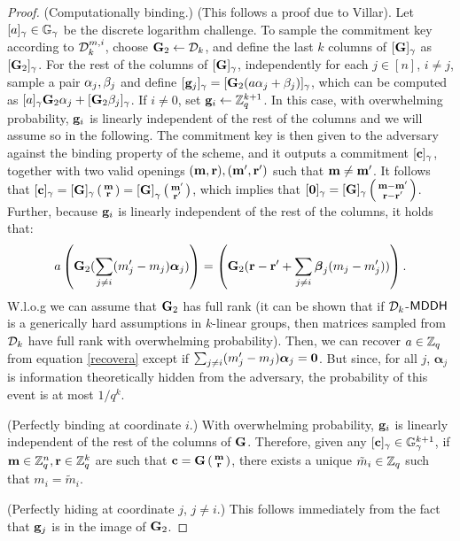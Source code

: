 \begin{proof}
(Computationally binding.) (This follows a proof due to Villar). Let $[a]_\gamma\in\mathbb{G}_{\gamma}$ be the discrete logarithm challenge. To sample the commitment key according to $\mathcal{D}_k^{m,i}$, choose $\mathbf{{G}}_{2} \gets \mathcal{D}_k$, and define the last $k$ columns of $[\mathbf{{G}}]_\gamma$ as $[\mathbf{{G}}_{2}]_{\gamma}$. For the rest of the columns of $[\mathbf{{G}}]_\gamma$, independently  for each $j \in [n]$, $i \neq j$, sample a pair $\mathbf{\alpha}_j,\mathbf{\beta}_j$ and define $[\mathbf{g}_{j}]_{\gamma}=[\mathbf{{G}}_{2} (a \mathbf{\alpha}_j+\beta_j)]_\gamma$,
which can be computed as $[a]_\gamma \mathbf{{G}}_{2}\mathbf{\alpha}_j+[ \mathbf{{G}}_{2} \beta_j]_\gamma$. If $i \neq 0$, set $\mathbf{g}_{i} \gets \mathbb{Z}_q^{k+1}$. In this case, with overwhelming probability,  $\mathbf{g}_{i}$ is linearly independent of the rest of the columns and we will assume so in the following. 
The commitment key is then given to the adversary against the binding property of the scheme, and it outputs a commitment $[\mathbf{c}]_{\gamma}$, together with two valid openings 
$(\mathbf{m},\mathbf{r}), (\mathbf{m}',\mathbf{r}')$ such that $\mathbf{m}\neq \mathbf{m}'$. It follows that $[\mathbf{c}]_{\gamma}=[\mathbf{{G}}]_{\gamma} \left(\begin{smallmatrix}\mathbf{m} \\ \mathbf{r}\end{smallmatrix}\right) = \left[\mathbf{{G}}\right]_{\gamma}\left(\begin{smallmatrix}\mathbf{m}' \\ \mathbf{r}'\end{smallmatrix}\right)$, which implies that $[\mathbf{0}]_{\gamma}=[\mathbf{{G}}]_{\gamma} \left(\begin{smallmatrix}\mathbf{m}-\mathbf{m}' \\ \mathbf{r}-\mathbf{r}'\end{smallmatrix}\right)$. Further, because $\mathbf{g}_i$ is linearly independent of the rest of the columns, it holds that:
\begin{equation}\label{recovera}
a \left(\mathbf{{G}}_{2} (\sum_{j \neq i} (m'_j-m_j)  \boldsymbol{\alpha}_j) \right) = \left(  \mathbf{{G}}_{2}  (\mathbf{r}-\mathbf{r}' + \sum_{j \neq i} \boldsymbol{\beta}_j  (m_j-m_j'))\right).
\end{equation}
W.l.o.g we can assume that $\mathbf{{G}}_{2}$ has full rank (it can be shown that if $\mathcal{D}_k$-$\mathsf{MDDH}$ is a generically hard assumptions in $k$-linear groups, then matrices sampled from $\mathcal{D}_k$ have full rank with overwhelming probability).  Then, we can recover $a \in \mathbb{Z}_q$ from equation \ref{recovera} except if $\sum_{j \neq i} (m'_j-m_j)  \boldsymbol{\alpha}_j = \mathbf{0}$. But since, for all $j$, $\boldsymbol{\alpha}_j$ is information theoretically hidden from the adversary, the probability of this event is at most 
$1/q^k$. 

(Perfectly binding at coordinate $i$.) With overwhelming probability, $\mathbf{g}_i$ is linearly independent of the rest of the columns of $\mathbf{{G}}$. Therefore, given any $[\mathbf{c}]_{\gamma} \in \mathbb{G}_{\gamma}^{k+1}$, if $\mathbf{m}\in\mathbb{Z}_q^n, \mathbf{r} \in\mathbb{Z}_q^k$ are such that $\mathbf{c}=\mathbf{{G}}\left(\begin{smallmatrix}\mathbf{m}\\ \mathbf{r}\end{smallmatrix}\right)$, there exists a unique $\tilde{m}_i \in \mathbb{Z}_q$ such 
that $m_i=\tilde{m}_i$. 

(Perfectly hiding at coordinate $j$, $j \neq i$.) This follows immediately from the fact that $\mathbf{g}_j$ is in the image 
of $\mathbf{{G}}_{2}$. 
\end{proof}


